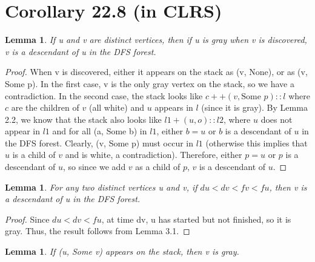 \documentclass{article}
\newtheorem{lemma}[theorem]{Lemma}
\begin{document}
\section{Corollary 22.8 (in CLRS)}
\begin{lemma}
If u and v are distinct vertices, then if u is gray when v is discovered, v is a descendant of u in the DFS forest.
\end{lemma}
\begin{proof}
When v is discovered, either it appears on the stack as (v, None), or as (v, Some p). In the first case, v is the only gray vertex on the stack, so we have a contradiction. In the second case, the stack looks like $c ++ (v, \text{Some }p) :: l$ where $c$ are the children of $v$ (all white) and $u$ appears in $l$ (since it is gray). By Lemma 2.2, we know that the stack also looks like $l1 + (u, o) :: l2$, where $u$ does not appear in $l1$ and for all (a, Some b) in $l1$, either $b=u$ or $b$ is a descendant of $u$ in the DFS forest. Clearly, (v, Some p) must occur in $l1$ (otherwise this implies that $u$ is a child of $v$ and is white, a contradiction). Therefore, either $p=u$ or $p$ is a descendant of $u$, so since we add $v$ as a child of $p$, $v$ is a descendant of $u$.
\end{proof}
\begin{lemma}
For any two distinct vertices u and v, if $du < dv < fv < fu$, then v is a descendant of u in the DFS forest.
\end{lemma}
\begin{proof}
Since $du < dv < fu$, at time dv, u has started but not finished, so it is gray. Thus, the result follows from Lemma 3.1.
\end{proof}
\begin{lemma}
If (u, Some v) appears on the stack, then v is gray.
\end{lemma}
\end{document}
